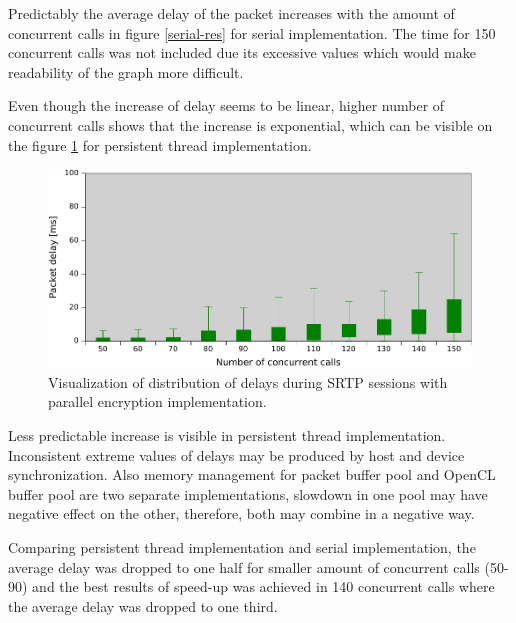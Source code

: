 Predictably the average delay of the packet increases with the amount of 
concurrent calls in figure \ref{serial-res} for serial implementation. The time
for 150 concurrent calls was not included due its excessive values which would
make readability of the graph more difficult. 

Even though the increase of delay seems to be linear, higher number of 
concurrent calls shows that the increase is exponential, which can be visible
on the figure \ref{pt-res} for persistent thread implementation.

\begin{figure}[H]
\centering
\includegraphics[width=15cm]{fig/persistent-thread-res.pdf}
\caption{Visualization of distribution of delays during SRTP sessions with 
parallel encryption implementation.}
\label{pt-res}
\end{figure}

Less predictable increase is visible in persistent thread implementation.
Inconsistent extreme values of delays may be produced by host and device
synchronization. Also memory management for packet buffer pool and OpenCL
buffer pool are two separate implementations, slowdown in one pool may have
negative effect on the other, therefore, both may combine in a negative way.

Comparing persistent thread implementation and serial implementation, the 
average delay was dropped to one half for smaller amount of concurrent calls
(50-90) and the best results of speed-up was achieved in 140 concurrent calls
where the average delay was dropped to one third.


\vspace{25em}

